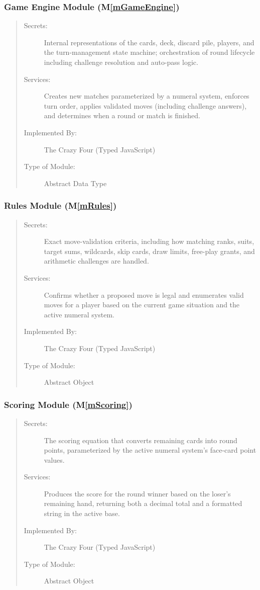\documentclass[12pt, titlepage]{article}
\newcommand{\mref}[1]{M\ref{#1}}
\begin{document}
\subsubsection{Game Engine Module (\mref{mGameEngine})}
\begin{quote}
\begin{description}
  \item[Secrets:] Internal representations of the cards, deck, discard pile, players, and the turn-management state machine; orchestration of round lifecycle including challenge resolution and auto-pass logic.
  \item[Services:] Creates new matches parameterized by a numeral system, enforces turn order, applies validated moves (including challenge answers), and determines when a round or match is finished.
  \item[Implemented By:] The Crazy Four (Typed JavaScript)
  \item[Type of Module:] Abstract Data Type
\end{description}
\end{quote}

\subsubsection{Rules Module (\mref{mRules})}
\begin{quote}
\begin{description}
  \item[Secrets:] Exact move-validation criteria, including how matching ranks, suits, target sums, wildcards, skip cards, draw limits, free-play grants, and arithmetic challenges are handled.
  \item[Services:] Confirms whether a proposed move is legal and enumerates valid moves for a player based on the current game situation and the active numeral system.
  \item[Implemented By:] The Crazy Four (Typed JavaScript)
  \item[Type of Module:] Abstract Object
\end{description}
\end{quote}

\subsubsection{Scoring Module (\mref{mScoring})}
\begin{quote}
\begin{description}
  \item[Secrets:] The scoring equation that converts remaining cards into round points, parameterized by the active numeral system's face-card point values.
  \item[Services:] Produces the score for the round winner based on the loser's remaining hand, returning both a decimal total and a formatted string in the active base.
  \item[Implemented By:] The Crazy Four (Typed JavaScript)
  \item[Type of Module:] Abstract Object
\end{description}
\end{quote}
\end{document}
